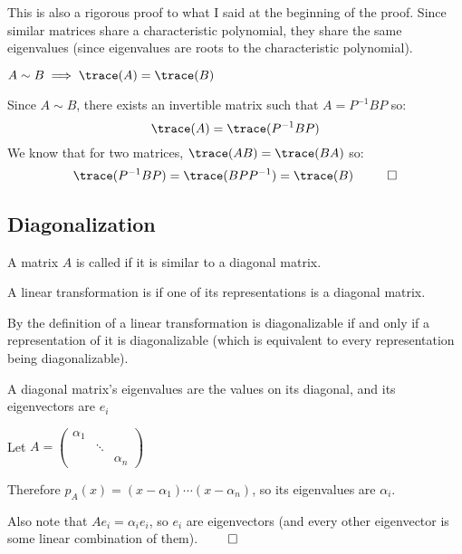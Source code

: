 \documentclass[10pt]{article}
\begin{document}
This is also a rigorous proof to what I said at the beginning of the proof. Since similar matrices share a characteristic polynomial, they share the same eigenvalues (since eigenvalues are roots to the characteristic polynomial).

\begin{statement}{$A\sim B \implies\trace(A)=\trace(B)$}

Since $A\sim B$, there exists an invertible matrix such that $A=P^{-1}BP$ so:
\[ \trace(A)=\trace(P^{-1}BP) \]
We know that for two matrices, $\trace(AB)=\trace(BA)$ so:
\[ \trace(P^{-1}BP) = \trace(BPP^{-1}) = \trace(B) ~~ \qed \]

\end{statement}

\newpage
\subsection{Diagonalization}

\begin{definition*}

A matrix $A$ is called  if it is similar to a diagonal matrix.

\end{definition*}

\begin{definition}

A linear transformation is  if one of its representations is a diagonal matrix.

\end{definition}

\noindent By the definition of  a linear transformation is diagonalizable if and only if a representation of it is diagonalizable (which is equivalent to every representation being diagonalizable).

\begin{lemma*}{A diagonal matrix's eigenvalues are the values on its diagonal, and its eigenvectors are $e_i$}

Let $A = \begin{pmatrix} \alpha_1 & & \\ & \ddots &  \\ & & \alpha_n \end{pmatrix}$

Therefore $p_A(x) = (x-\alpha_1)\cdots(x-\alpha_n)$, so its eigenvalues are $\alpha_i$.

Also note that $Ae_i=\alpha_i e_i$, so $e_i$ are eigenvectors (and every other eigenvector is some linear combination of them). $\qed$

\end{lemma*}
\end{document}
